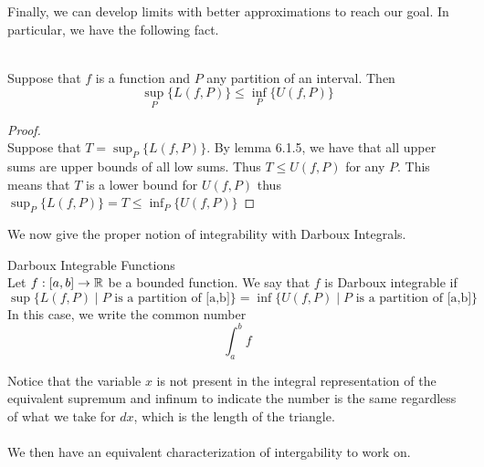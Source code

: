 \documentclass[a4paper]{article}
\begin{document}
Finally, we can develop limits with better approximations to reach our goal. In particular, we have the following fact. 

\begin{lmm}{}{}\\ Suppose that $f$ is a function and $P$ any partition of an interval. Then $$\sup_P\{L(f,P)\}\leq\inf_P\{U(f,P)\}$$ 
\begin{proof}\\ Suppose that $T=\sup_P\{L(f,P)\}$. By lemma 6.1.5, we have that all upper sums are upper bounds of all low sums. Thus $T\leq U(f,P)$ for any $P$. This means that $T$ is a lower bound for $U(f,P)$ thus $\sup_P\{L(f,P)\}=T\leq\inf_P\{U(f,P)\}$
\end{proof}
\end{lmm}

We now give the proper notion of integrability with Darboux Integrals. 

\begin{defn}{Darboux Integrable Functions}{}\\ Let $f:[a,b]\to\mathbb{R}$ be a bounded function. We say that $f$ is Darboux integrable if $$\sup\{L(f,P)\;|\;P\text{ is a partition of [a,b]}\}=\inf\{U(f,P)\;|\;P\text{ is a partition of [a,b]}\}$$ In this case, we write the common number $$\int_{a}^{b}f$$
\end{defn}

Notice that the variable $x$ is not present in the integral representation of the equivalent supremum and infinum to indicate the number is the same regardless of what we take for $dx$, which is the length of the triangle. \\~\\
We then have an equivalent characterization of intergability to work on. 
\end{document}
